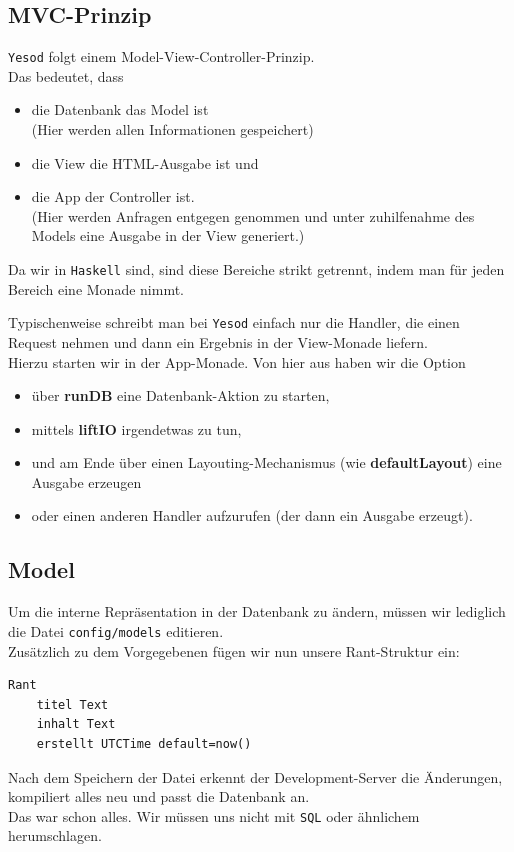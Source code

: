 \documentclass{beamer}
\begin{document}
\subsection{MVC-Prinzip}

\begin{frame}[fragile]
\texttt{Yesod} folgt einem Model-View-Controller-Prinzip. \\\pause
Das bedeutet, dass
\begin{itemize}
 \item die Datenbank das Model ist\\\pause
       (Hier werden allen Informationen gespeichert)
 \pause
 \item die View die HTML-Ausgabe ist und
 \pause
 \item die App der Controller ist.\\\pause
       (Hier werden Anfragen entgegen genommen und unter zuhilfenahme des Models eine Ausgabe in der View generiert.)
\end{itemize}
\pause
Da wir in \texttt{Haskell} sind, sind diese Bereiche strikt getrennt, indem man für jeden Bereich eine Monade nimmt.
\end{frame}

\begin{frame}[fragile]
Typischenweise schreibt man bei \texttt{Yesod} einfach nur die Handler, die einen Request nehmen und dann ein Ergebnis in der View-Monade liefern.\\\pause
Hierzu starten wir in der \glqq App\grqq -Monade. Von hier aus haben wir die Option
\begin{itemize}
\pause
 \item über \textbf{runDB} eine Datenbank-Aktion zu starten,
\pause
 \item mittels \textbf{liftIO} irgendetwas zu tun,
\pause
 \item und am Ende über einen Layouting-Mechanismus (wie \textbf{defaultLayout}) eine Ausgabe erzeugen
\pause
 \item oder einen anderen Handler aufzurufen (der dann ein Ausgabe erzeugt).
\end{itemize}
\end{frame}



\subsection{Model}

\begin{frame}[fragile]
Um die interne Repräsentation in der Datenbank zu ändern, müssen wir lediglich die Datei \texttt{config/models} editieren. \\\pause
Zusätzlich zu dem Vorgegebenen fügen wir nun unsere Rant-Struktur ein:
\begin{verbatim}
Rant
    titel Text
    inhalt Text
    erstellt UTCTime default=now()
\end{verbatim}
\pause
Nach dem Speichern der Datei erkennt der Development-Server die Änderungen, kompiliert alles neu und passt die Datenbank an.\\\pause
Das war schon alles. Wir müssen uns nicht mit \texttt{SQL} oder ähnlichem herumschlagen.
\end{frame}
\end{document}
